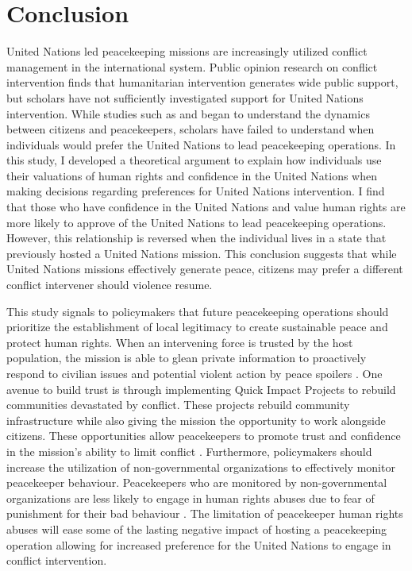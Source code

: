 \documentclass[12pt]{article}
\newcommand{\UN}[1]{United Nations}
\newcommand{\PKOs}[1]{peacekeeping operations}
\begin{document}
\section*{Conclusion}

United Nations led peacekeeping missions are increasingly utilized conflict management in the international system. Public opinion research on conflict intervention finds that humanitarian intervention generates wide public support, but scholars have not sufficiently investigated support for \UN{} intervention. While studies such as \cite{mary2013peacekeepers} and \cite{gordon2017cooperation} began to understand the dynamics between citizens and peacekeepers, scholars have failed to understand when individuals would prefer the \UN{} to lead peacekeeping operations. In this study, I developed a theoretical argument to explain how individuals use their valuations of human rights and confidence in the \UN{} when making decisions regarding preferences for \UN{} intervention. I find that those who have confidence in the \UN{} and value human rights are more likely to approve of the \UN{} to lead peacekeeping operations. However, this relationship is reversed when the individual lives in a state that previously hosted a \UN{} mission. This conclusion suggests that while \UN{} missions effectively generate peace, citizens may prefer a different conflict intervener should violence resume. 

This study signals to policymakers that future \PKOs{} should prioritize the establishment of local legitimacy to create sustainable peace and protect human rights. When an intervening force is trusted by the host population, the mission is able to glean private information to proactively respond to civilian issues and potential violent action by peace spoilers \citep{furnari2015relationships}. One avenue to build trust is through implementing Quick Impact Projects to rebuild communities devastated by conflict. These projects rebuild community infrastructure while also giving the mission the opportunity to work alongside citizens. These opportunities allow peacekeepers to promote trust and confidence in the mission's ability to limit conflict \citep{QIPs,gordon2017cooperation}. Furthermore, policymakers should increase the utilization of non-governmental organizations to effectively monitor peacekeeper behaviour. Peacekeepers who are monitored by non-governmental organizations are less likely to engage in human rights abuses due to fear of punishment for their bad behaviour \citep{keck1998activists}. The limitation of peacekeeper human rights abuses will ease some of the lasting negative impact of hosting a peacekeeping operation allowing for increased preference for the \UN{} to engage in conflict intervention. 
\end{document}
